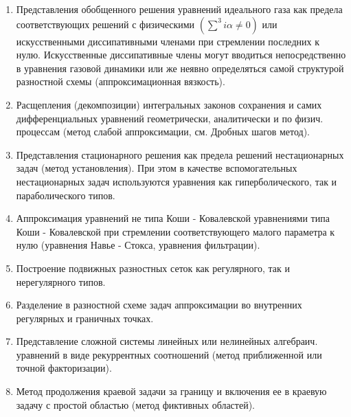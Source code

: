 \documentclass[10pt]{article}
\begin{document}
\begin{enumerate}

  \item Представления обобщенного решения уравнений идеального газа как предела соответствующих решений с физическими $\left(\sum^{3} i \alpha \neq 0\right)$ или искусственными диссипативными членами при стремлении последних к нулю. Искусственные диссипативные члены могут вводиться непосредственно в уравнения газовой динамики или же неявно определяться самой структурой разностной схемы (аппроксимационная вязкость).



  \item Расщепления (декомпозиции) интегральных законов сохранения и самих дифференциальных уравнений геометрически, аналитически и по физич. процессам (метод слабой аппроксимации, см. Дробных шагов метод).



  \item Представления стационарного решения как предела решений нестационарных задач (метод установления). При этом в качестве вспомогательных нестационарных задач используются уравнения как гиперболического, так и параболического типов.



  \item Аппроксимация уравнений не типа Коши - Ковалевской уравнениями типа Коши - Ковалевской при стремлении соответствующего малого параметра к нулю (уравнения Навье - Стокса, уравнения фильтрации).



  \item Построение подвижных разностных сеток как регулярного, так и нерегулярного типов.



  \item Разделение в разностной схеме задач аппроксимации во внутренних регулярных и граничных точках.



  \item Представление сложной системы линейных или нелинейных алгебраич. уравнений в виде рекуррентных соотношений (метод приближенной или точной факторизации).



  \item Метод продолжения краевой задачи за границу и включения ее в краевую задачу с простой областью (метод фиктивных областей).



\end{enumerate}
\end{document}
